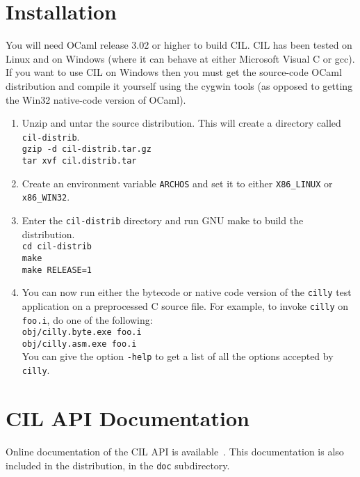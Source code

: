 \documentclass{article}
\newcommand{\hsp}{\hspace{0.5in}}
\newcommand{\t}[1]{{\tt #1}}
\begin{document}
\section{Installation}

You will need OCaml release 3.02 or higher to build CIL. CIL has been tested
on Linux and on Windows (where it can behave at either Microsoft Visual C or
gcc). If you want to use CIL on Windows then you must get the source-code
OCaml distribution and compile it yourself using the cygwin tools (as opposed
to getting the Win32 native-code version of OCaml).

\begin{enumerate}
\item Unzip and untar the source distribution. This will create a directory
      called \t{cil-distrib}. \\
      \hsp\verb!gzip -d cil-distrib.tar.gz!\\
      \hsp\verb!tar xvf cil.distrib.tar!
\item Create an environment variable \t{ARCHOS} and set it to either
      \t{X86\_LINUX} or \t{x86\_WIN32}.
\item Enter the \t{cil-distrib} directory and run GNU make to build the 
      distribution.\\
      \hsp\verb!cd cil-distrib!\\
      \hsp\verb!make!\\
      \hsp\verb!make RELEASE=1!\\

\item You can now run either the bytecode or native code version of the
      \t{cilly} test application on a preprocessed C source file. For example,
      to invoke \t{cilly} on \t{foo.i}, do one of the following:\\
      \hsp\verb!obj/cilly.byte.exe foo.i!\\
      \hsp\verb!obj/cilly.asm.exe foo.i!\\
      You can give the option \verb!-help! to get a list of all
      the options accepted by \t{cilly}.
\end{enumerate}

\section{CIL API Documentation} 
Online documentation of the CIL API is available~. This
documentation is also included in the distribution, in the \t{doc}
subdirectory. 
\end{document}
